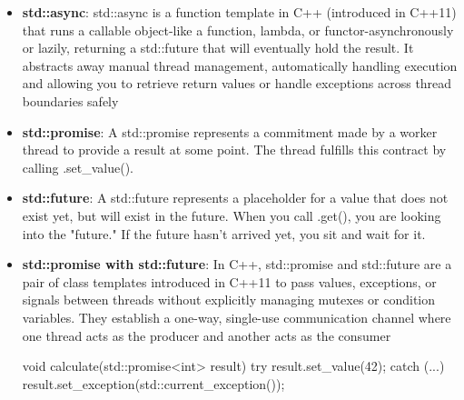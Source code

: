 \documentclass{report}
\begin{document}
\begin{itemize}
\begin{cppcode}
{                     std::barrier sync_point(2, on_completion);

                     auto worker = [&](std::string name) {
                         ...

                         // Block until all 2 threads reach this point
                         sync_point.arrive_and_wait(); 

                         ...

                         // Reuse the same barrier for the next phase
                         sync_point.arrive_and_wait(); 

                         ...
                     };

                     std::vector<std::thread> threads;
                     threads.emplace_back(worker, "Thread A");
                     threads.emplace_back(worker, "Thread B");

                     for (auto& t : threads) {
                         t.join();
                     }

                     return 0;
                 }
             \end{cppcode}
            \item \textbf{std::async}: std::async is a function template in C++ (introduced in C++11) that runs a callable object-like a function, lambda, or functor-asynchronously or lazily, returning a std::future that will eventually hold the result. It abstracts away manual thread management, automatically handling execution and allowing you to retrieve return values or handle exceptions across thread boundaries safely
            \item \textbf{std::promise}: A std::promise represents a commitment made by a worker thread to provide a result at some point.  The thread fulfills this contract by calling .set\_value().
            \item \textbf{std::future}: A std::future represents a placeholder for a value that does not exist yet, but will exist in the future.
                \bigbreak \noindent 
                When you call .get(), you are looking into the "future." If the future hasn't arrived yet, you sit and wait for it.
            \item \textbf{std::promise with std::future}: In C++, std::promise and std::future are a pair of class templates introduced in C++11 to pass values, exceptions, or signals between threads without explicitly managing mutexes or condition variables. They establish a one-way, single-use communication channel where one thread acts as the producer and another acts as the consumer
                \bigbreak \noindent 
                \begin{cppcode}
                    void calculate(std::promise<int> result)
                    {
                        try {
                            result.set_value(42);
                        } catch (...) {
                            result.set_exception(std::current_exception());
                        }
                    }


\end{cppcode}
\end{itemize}
\end{document}
